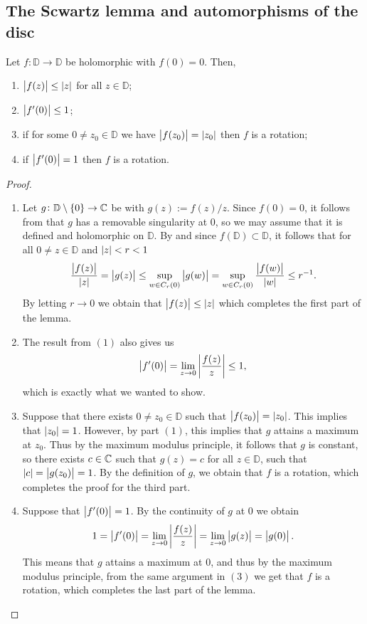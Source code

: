 \documentclass[11pt,a4paper]{article}
\begin{document}
\subsection{The Scwartz lemma and automorphisms of the disc}
\begin{lemma}
  Let $f \colon \mathbb D \to \mathbb D$ be holomorphic with $f(0) = 0$.
  Then,
  \begin{enumerate}
    \item[(1)] $\left\lvert f(z)\right\rvert \le \left\lvert z\right\rvert$ for all $z \in \mathbb D$;
    \item[(2)] $\left\lvert f'(0)\right\rvert \le 1$;
    \item[(3)] if for some $0 \neq z_0 \in \mathbb D$ we have
      $\left\lvert f(z_0)\right\rvert = \left\lvert z_0\right\rvert$ then $f$ is a rotation;
    \item[(4)] if $\left\lvert f'(0)\right\rvert = 1$ then $f$ is a rotation.
  \end{enumerate}
\end{lemma}
\begin{proof} \phantom{}
\begin{enumerate}
  \item[(1)] Let $g \colon \mathbb D \setminus \left\{0\right\} \to \mathbb{C}$ be with
    $g(z) := f(z) / z$.
    Since $f(0) = 0$, it follows from 
    that $g$ has a removable singularity at $0$, so we may assume that
    it is defined and holomorphic on $\mathbb D$.
    By  and since
    $f(\mathbb D) \subset \mathbb D$,
    it follows that for all $0 \neq z \in \mathbb D$ and $\left\lvert z\right\rvert < r < 1$
    \[
      \frac{\left\lvert f(z)\right\rvert}{\left\lvert z\right\rvert} =
      \left\lvert g(z)\right\rvert \le
      \sup_{w \in C_r(0)} \left\lvert g(w)\right\rvert =
      \sup_{w \in C_r(0)} \frac{\left\lvert f(w)\right\rvert}{\left\lvert w\right\rvert} \le r^{-1}.
    \]
    By letting $r \to 0$ we obtain that $\left\lvert f(z)\right\rvert \le \left\lvert z\right\rvert$ which completes
    the first part of the lemma.
  \item[(2)] The result from $(1)$ also gives us
    \[
      \left\lvert f'(0)\right\rvert =
      \lim_{z \to 0} \left\lvert\frac{f(z)}{z}\right\rvert \le 1,
    \]
    which is exactly what we wanted to show.
  \item[(3)] Suppose that there exists $0 \neq z_0 \in \mathbb D$ such that
    $\left\lvert f(z_0)\right\rvert = \left\lvert z_0\right\rvert$.
    This implies that $\left\lvert z_0\right\rvert = 1$.
    However, by part $(1)$, this implies that $g$ attains a maximum at $z_0$.
    Thus by the maximum modulus principle, it follows that $g$ is constant,
    so there exists $c \in \mathbb{C}$ such that $g(z) = c$ for all $z \in \mathbb D$,
    such that $\left\lvert c\right\rvert = \left\lvert g(z_0)\right\rvert = 1$.
    By the definition of $g$, we obtain that $f$ is a rotation, which completes
    the proof for the third part.
  \item[(4)] Suppose that $\left\lvert f'(0)\right\rvert = 1$.
    By the continuity of $g$ at $0$ we obtain
    \[
      1 = \left\lvert f'(0)\right\rvert =
      \lim_{z \to 0} \left\lvert\frac{f(z)}{z}\right\rvert =
      \lim_{z \to 0} \left\lvert g(z)\right\rvert =
      \left\lvert g(0)\right\rvert.
    \]
    This means that $g$ attains a maximum at $0$, and thus by the maximum
    modulus principle, from the same argument in $(3)$ we get that $f$
    is a rotation, which completes the last part of the lemma.
\end{enumerate}
\end{proof}
\end{document}
